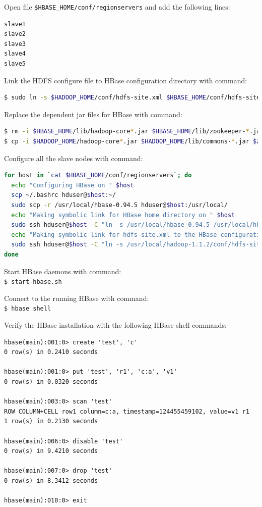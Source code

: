 Open file \verb|$HBASE_HOME/conf/regionservers| and add the following lines:
\begin{verbatim}
slave1
slave2
slave3
slave4
slave5
\end{verbatim}

Link the HDFS configure file to HBase configuration directory with command:
\lstset{style=bashstyle}
\begin{lstlisting}[language=bash]
$ sudo ln -s $HADOOP_HOME/conf/hdfs-site.xml $HBASE_HOME/conf/hdfs-site.xml
\end{lstlisting}

Replace the dependent jar files for HBase with command:
\lstset{style=bashstyle}
\begin{lstlisting}[language=bash]
$ rm -i $HBASE_HOME/lib/hadoop-core*.jar $HBASE_HOME/lib/zookeeper-*.jar
$ cp -i $HADOOP_HOME/hadoop-core*.jar $HADOOP_HOME/lib/commons-*.jar $ZK_HOME/zookeeper-*.jar $HBASE_HOME/lib/
\end{lstlisting}

Configure all the slave nodes with command:
\lstset{style=bashstyle}
\begin{lstlisting}[language=bash]
for host in `cat $HBASE_HOME/conf/regionservers`; do
  echo "Configuring HBase on " $host
  scp ~/.bashrc hduser@$host:~/
  sudo scp -r /usr/local/hbase-0.94.5 hduser@$host:/usr/local/
  echo "Making symbolic link for HBase home directory on " $host
  sudo ssh hduser@$host -C "ln -s /usr/local/hbase-0.94.5 /usr/local/hbase"
  echo "Making symbolic link for hdfs-site.xml to the HBase configuration directory on " $host
  sudo ssh hduser@$host -C "ln -s /usr/local/hadoop-1.1.2/conf/hdfs-site.xml /usr/local/hbase-0.94.5/conf/hdfs-site.xml"
done
\end{lstlisting}

Start HBase daemons with command: \\
\verb|$ start-hbase.sh|

Connect to the running HBase with command: \\
\verb|$ hbase shell|

Verify the HBase installation with the following HBase shell commands: 
\lstset{style=bashstyle}
\begin{lstlisting}
hbase(main):001:0> create 'test', 'c'
0 row(s) in 0.2410 seconds

hbase(main):001:0> put 'test', 'r1', 'c:a', 'v1'
0 row(s) in 0.0320 seconds

hbase(main):003:0> scan 'test'
ROW COLUMN+CELL row1 column=c:a, timestamp=124455459102, value=v1 r1
1 row(s) in 0.2130 seconds

hbase(main):006:0> disable 'test'
0 row(s) in 9.4210 seconds

hbase(main):007:0> drop 'test'
0 row(s) in 8.3412 seconds

hbase(main):010:0> exit
\end{lstlisting}

